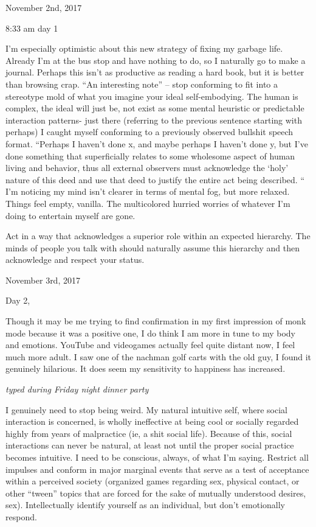 November 2nd, 2017

8:33 am day 1

I'm especially optimistic about this new strategy of fixing my garbage
life. Already I'm at the bus stop and have nothing to do, so I naturally
go to make a journal. Perhaps this isn't as productive as reading a hard
book, but it is better than browsing crap. ``An interesting note'' --
stop conforming to fit into a stereotype mold of what you imagine your
ideal self-embodying. The human is complex, the ideal will just be, not
exist as some mental heuristic or predictable interaction patterns- just
there (referring to the previous sentence starting with perhaps) I
caught myself conforming to a previously observed bullshit speech
format. ``Perhaps I haven't done x, and maybe perhaps I haven't done y,
but I've done something that superficially relates to some wholesome
aspect of human living and behavior, thus all external observers must
acknowledge the `holy' nature of this deed and use that deed to justify
the entire act being described. `` I'm noticing my mind isn't clearer in
terms of mental fog, but more relaxed. Things feel empty, vanilla. The
multicolored hurried worries of whatever I'm doing to entertain myself
are gone.

Act in a way that acknowledges a superior role within an expected
hierarchy. The minds of people you talk with should naturally assume
this hierarchy and then acknowledge and respect your status.

\bigskip
\bigskip
November 3rd, 2017

Day 2,

Though it may be me trying to find confirmation in my first impression
of monk mode because it was a positive one, I do think I am more in tune
to my body and emotions. YouTube and videogames actually feel quite
distant now, I feel much more adult. I saw one of the nachman golf carts
with the old guy, I found it genuinely hilarious. It does seem my
sensitivity to happiness has increased.

\emph{typed during Friday night dinner party}

I genuinely need to stop being weird. My natural intuitive self, where
social interaction is concerned, is wholly ineffective at being cool or
socially regarded highly from years of malpractice (ie, a shit social
life). Because of this, social interactions can never be natural, at
least not until the proper social practice becomes intuitive. I need to
be conscious, always, of what I'm saying. Restrict all impulses and
conform in major marginal events that serve as a test of acceptance
within a perceived society (organized games regarding sex, physical
contact, or other ``tween'' topics that are forced for the sake of
mutually understood desires, sex). Intellectually identify yourself as
an individual, but don't emotionally respond.

